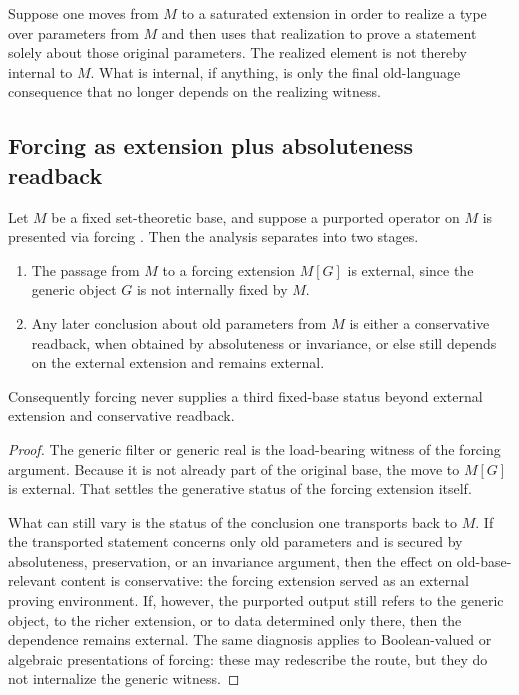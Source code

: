 \begin{example}
Suppose one moves from $M$ to a saturated extension in order to realize a type over parameters from $M$ and then uses that realization to prove a statement solely about those original parameters. The realized element is not thereby internal to $M$. What is internal, if anything, is only the final old-language consequence that no longer depends on the realizing witness.
\end{example}

\subsection{Forcing as extension plus absoluteness readback}

\begin{proposition}\label{prop:app-forcing-decomposition}
Let $M$ be a fixed set-theoretic base, and suppose a purported operator on $M$ is presented via forcing \citep{Jech2003,Kanamori2008}. Then the analysis separates into two stages.
\begin{enumerate}[label=(\alph*)]
    \item The passage from $M$ to a forcing extension $M[G]$ is external, since the generic object $G$ is not internally fixed by $M$.
    \item Any later conclusion about old parameters from $M$ is either a conservative readback, when obtained by absoluteness or invariance, or else still depends on the external extension and remains external.
\end{enumerate}
Consequently forcing never supplies a third fixed-base status beyond external extension and conservative readback.
\end{proposition}

\begin{proof}
The generic filter or generic real is the load-bearing witness of the forcing argument. Because it is not already part of the original base, the move to $M[G]$ is external. That settles the generative status of the forcing extension itself.

What can still vary is the status of the conclusion one transports back to $M$. If the transported statement concerns only old parameters and is secured by absoluteness, preservation, or an invariance argument, then the effect on old-base-relevant content is conservative: the forcing extension served as an external proving environment. If, however, the purported output still refers to the generic object, to the richer extension, or to data determined only there, then the dependence remains external. The same diagnosis applies to Boolean-valued or algebraic presentations of forcing: these may redescribe the route, but they do not internalize the generic witness.
\end{proof}

